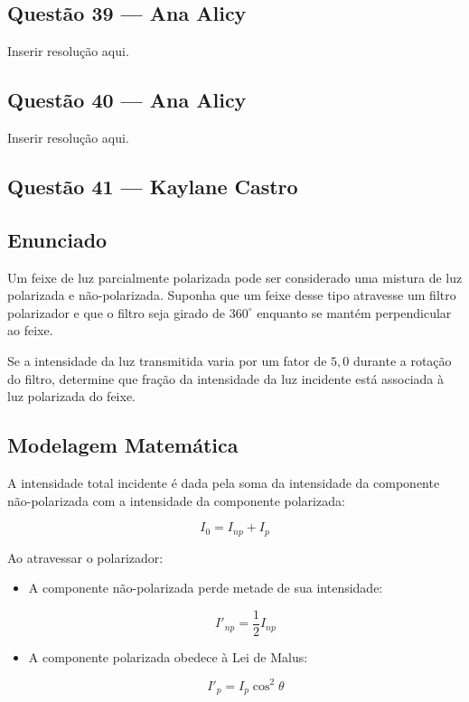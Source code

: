 \documentclass[12pt,a4paper]{article}
\begin{document}
\subsection{Questão 39 — Ana Alicy}
Inserir resolução aqui.

\subsection{Questão 40 — Ana Alicy}
Inserir resolução aqui.

\subsection{Questão 41 — Kaylane Castro}

\subsection*{Enunciado}

Um feixe de luz parcialmente polarizada pode ser considerado uma mistura de luz polarizada e não-polarizada. Suponha que um feixe desse tipo atravesse um filtro polarizador e que o filtro seja girado de $360^\circ$ enquanto se mantém perpendicular ao feixe.

Se a intensidade da luz transmitida varia por um fator de $5,0$ durante a rotação do filtro, determine que fração da intensidade da luz incidente está associada à luz polarizada do feixe.


\subsection*{Modelagem Matemática}

A intensidade total incidente é dada pela soma da intensidade da componente não-polarizada com a intensidade da componente polarizada:

\[
I_0 = I_{np} + I_p
\]

Ao atravessar o polarizador:

\begin{itemize}
    \item A componente não-polarizada perde metade de sua intensidade:
    
    \[
    I'_{np} = \frac{1}{2}I_{np}
    \]

    \item A componente polarizada obedece à Lei de Malus:
    
    \[
    I'_p = I_p\cos^2\theta
    \]
\end{itemize}
\end{document}
